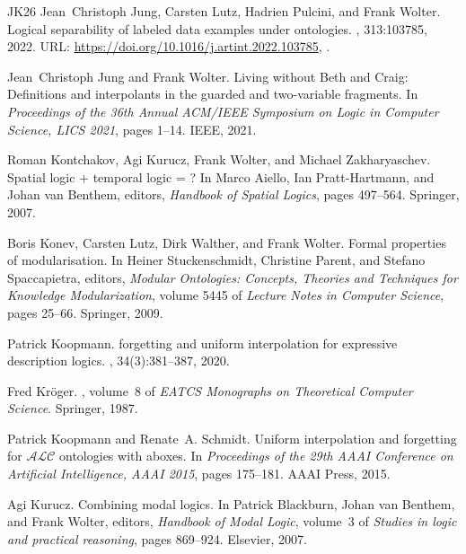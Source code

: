 \documentclass[10pt,a4paper]{amsart}
\theoremstyle{plain}
\theoremstyle{definition}
\begin{document}
\begin{thebibliography}{{}JK{\etalchar{+}}26}
Jean~Christoph Jung, Carsten Lutz, Hadrien Pulcini, and Frank Wolter.
\newblock Logical separability of labeled data examples under ontologies.
, 313:103785, 2022.
\newblock URL: \url{https://doi.org/10.1016/j.artint.2022.103785}, \href {https://doi.org/10.1016/J.ARTINT.2022.103785} {}.

Jean~Christoph Jung and Frank Wolter.
\newblock Living without {B}eth and {C}raig: Definitions and interpolants in the guarded and two-variable fragments.
\newblock In {\em Proceedings of the 36th Annual {ACM/IEEE} Symposium on Logic in Computer Science, {LICS} 2021}, pages 1--14. {IEEE}, 2021.

Roman Kontchakov, Agi Kurucz, Frank Wolter, and Michael Zakharyaschev.
\newblock Spatial logic + temporal logic = ?
\newblock In Marco Aiello, Ian Pratt{-}Hartmann, and Johan van Benthem, editors, {\em Handbook of Spatial Logics}, pages 497--564. Springer, 2007.

Boris Konev, Carsten Lutz, Dirk Walther, and Frank Wolter.
\newblock Formal properties of modularisation.
\newblock In Heiner Stuckenschmidt, Christine Parent, and Stefano Spaccapietra, editors, {\em Modular Ontologies: Concepts, Theories and Techniques for Knowledge Modularization}, volume 5445 of {\em Lecture Notes in Computer Science}, pages 25--66. Springer, 2009.

Patrick Koopmann.
 forgetting and uniform interpolation for expressive description logics.
, 34(3):381--387, 2020.

Fred Kr{\"{o}}ger.
, volume~8 of {\em {EATCS} Monographs on Theoretical Computer Science}.
\newblock Springer, 1987.

Patrick Koopmann and Renate~A. Schmidt.
\newblock Uniform interpolation and forgetting for $\mathcal{ALC}$ ontologies with aboxes.
\newblock In {\em Proceedings of the 29th {AAAI} Conference on Artificial Intelligence, {AAAI} 2015}, pages 175--181. {AAAI} Press, 2015.

Agi Kurucz.
\newblock Combining modal logics.
\newblock In Patrick Blackburn, Johan van Benthem, and Frank Wolter, editors, {\em Handbook of Modal Logic}, volume~3 of {\em Studies in logic and practical reasoning}, pages 869--924. Elsevier, 2007.


\end{thebibliography}
\end{document}
